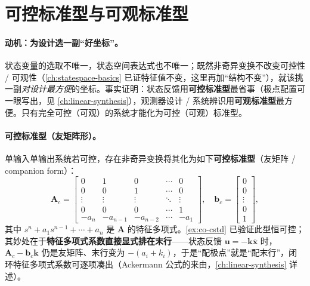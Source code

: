 \section{可控标准型与可观标准型}
\label{sec:co-canonical}

\paragraph{动机：为设计选一副“好坐标”。}
状态变量的选取不唯一，状态空间表达式也不唯一；既然非奇异变换不改变可控性 / 可观性（\cref{ch:statespace-basics} 已证特征值不变，这里再加“结构不变”），就该挑一副\emph{对设计最方便}的坐标。事实证明\cite{liubao2006modern}：状态反馈用\textbf{可控标准型}最省事（极点配置可一眼写出，见 \cref{ch:linear-synthesis}），观测器设计 / 系统辨识用\textbf{可观标准型}最方便。只有完全可控（可观）的系统才能化为可控（可观）标准型。

\paragraph{可控标准型（友矩阵形）。}
单输入单输出系统若可控，存在非奇异变换将其化为如下\textbf{可控标准型}（友矩阵 / companion form）\cite{zhang2017modern}：
\begin{equation}
  \mathbf{A}_c=\begin{bmatrix}
    0&1&0&\cdots&0\\
    0&0&1&\cdots&0\\
    \vdots&\vdots&\vdots&\ddots&\vdots\\
    0&0&0&\cdots&1\\
    -a_n&-a_{n-1}&-a_{n-2}&\cdots&-a_1
  \end{bmatrix},\quad
  \mathbf{b}_c=\begin{bmatrix}0\\0\\\vdots\\0\\1\end{bmatrix},
  \label{eq:co-cstd}
\end{equation}
其中 $s^n+a_1 s^{n-1}+\cdots+a_n$ 是 $\mathbf{A}$ 的特征多项式。\cref{ex:co-cstd} 已验证此型恒可控；其妙处在于\textbf{特征多项式系数直接显式排在末行}——状态反馈 $\mathbf{u}=-\mathbf{k}\bar{\mathbf{x}}$ 时，$\mathbf{A}_c-\mathbf{b}_c\mathbf{k}$ 仍是友矩阵、末行变为 $-(a_i+k_i)$，于是“配极点”就是“配末行”，闭环特征多项式系数可逐项凑出（Ackermann 公式的来由，\cref{ch:linear-synthesis} 详述）。

